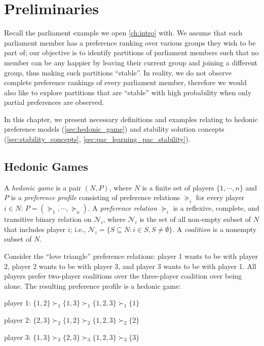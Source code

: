 
\chapter{Preliminaries}
\label{ch:preliminaries}

Recall the parliament example we open \autoref{ch:intro} with. We assume that each
parliament member has a preference ranking over various groups they wish to be
part of; our objective is to identify partitions of parliament members such that
no member can be any happier by leaving their current group and joining a
different group, thus making such partitions ``stable''.
In reality, we do not observe complete preference rankings of every parliament
member, therefore we would also like to explore partitions that are ``stable''
with high probability when only partial preferences are observed.

In this chapter, we present necessary definitions and examples relating to
hedonic preference models (\autoref{sec:hedonic_game}) and
stability solution concepts (\autoref{sec:stability_concepts},
\autoref{sec:pac_learning_pac_stability}).

\section{Hedonic Games}
\label{sec:hedonic_game}

A \textit{hedonic game} is a pair $(N, P)$, where $N$ is a finite set of players
$\{1, \cdots, n\}$ and $P$ is a \textit{preference profile} consisting of
preference relations $\succeq_i$ for every player $i \in N$:
$P = (\succeq_1, \cdots, \succeq_n)$.
A \textit{preference relation} $\succeq_i$ is a reflexive, complete, and
transitive binary relation on $\mathcal{N}_i$, where $\mathcal{N}_i$ is the set
of all non-empty subset of $N$ that includes player $i$;
i.e., $\mathcal{N}_i = \{S \subseteq N: i \in S, S \neq \emptyset \}$.
A \textit{coalition} is a nonempty subset of $N$.

\begin{example}
\label{example:not_top_responsive_pref}
  Consider the ``love triangle'' preference relations: player 1 wants
  to be with player 2, player 2 wants to be with player 3, and player 3 wants to
  be with player 1. All players prefer two-player coalitions over the three-player
  coalition over being alone.
  The resulting preference profile is a hedonic game:

  player 1: $\{1, 2\} \succ_1 \{1, 3\} \succ_1 \{1, 2, 3\} \succ_1  \{1\}$

  player 2: $\{2, 3\} \succ_2 \{1, 2\} \succ_2 \{1, 2, 3\} \succ_2  \{2\}$

  player 3: $\{1, 3\} \succ_3 \{2, 3\} \succ_3 \{1, 2, 3\} \succ_3  \{3\}$
\end{example}

